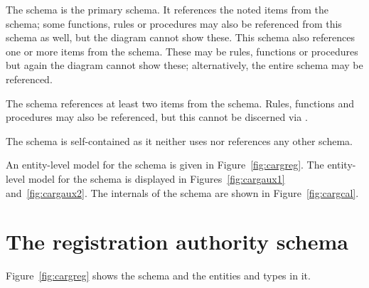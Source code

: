 \documentclass{article}
\begin{document}
The schema  is the primary schema. It references
the noted items from the  schema; some functions, rules or
procedures may also be referenced from this schema as well, but the diagram
cannot show these. This schema also references one or more items from the
 schema. These may be rules, functions or procedures but again
the diagram cannot show these; alternatively, the entire schema may be
referenced.

The  schema references at least two items from the
 schema. Rules, functions and procedures may also be
referenced, but this cannot be discerned via \ExpressG.

The  schema is self-contained as it neither uses nor references
any other schema.

An entity-level model for the  schema is given
in Figure~\ref{fig:cargreg}. The entity-level model for the 
schema is displayed in Figures~\ref{fig:cargaux1} and~\ref{fig:cargaux2}. The
internals of the  schema are shown in Figure~\ref{fig:cargcal}.

\clearpage

\section{The registration authority schema}

Figure~\ref{fig:cargreg} shows the  schema and 
the entities and types in it.
\end{document}
